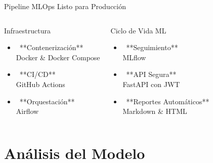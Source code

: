\documentclass{beamer}
\begin{document}
\begin{frame}{Pipeline MLOps Listo para Producción}
  \begin{columns}[T]
      \begin{block}{Infraestructura}
        \begin{itemize}
          \item \faDocker\ **Contenerización** \\ Docker & Docker Compose
          \item \faGithub\ **CI/CD** \\ GitHub Actions
          \item \faPaperPlane\ **Orquestación** \\ Airflow
        \end{itemize}
      \end{block}
      \begin{block}{Ciclo de Vida ML}
        \begin{itemize}
          \item \faChartBar\ **Seguimiento** \\ MLflow
          \item \faKey\ **API Segura** \\ FastAPI con JWT
          \item \faFileAlt\ **Reportes Automáticos** \\ Markdown & HTML
        \end{itemize}
      \end{block}
  \end{columns}
\end{frame}

\section{Análisis del Modelo}
\end{document}
